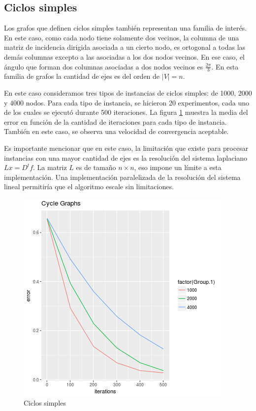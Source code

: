 \documentclass[conference,compsoc,a4paper]{IEEEtran}
\begin{document}
\subsection{Ciclos simples}

Los grafos que definen ciclos simples también representan una familia 
de interés. En este caso, como cada nodo tiene solamente dos vecinos, 
la columna de una matriz de incidencia dirigida asociada a un cierto 
nodo, es ortogonal a todas las demás columnas excepto a las asociadas a 
los dos nodos vecinos. En ese caso, el ángulo que forman dos columnas
asociadas a dos nodos vecinos es $\frac{2\pi}{3}$. En esta familia de 
grafos la cantidad de ejes es del orden de $|V| = n$.

\smallskip

En este caso consideramos tres tipos de instancias de ciclos simples: 
de 1000, 2000 y 4000 nodos. Para cada tipo de instancia, se hicieron 
20 experimentos, cada uno de los cuales se ejecutó durante 500 
iteraciones. La figura \ref{fig:cycle} muestra la media del error en 
función de la cantidad de iteraciones para cada tipo de instancia. 
También en este caso, se observa una velocidad de convergencia 
aceptable.

\smallskip

Es importante mencionar que en este caso, la limitación que existe para 
procesar instancias con una mayor cantidad de ejes es la resolución del 
sistema laplaciano $Lx = D^t f$. La matriz $L$ es de tamaño $n \times 
n$, eso impone un límite a esta implementación. Una implementación 
paralelizada de la resolución del sistema lineal permitiría que el 
algoritmo escale sin limitaciones.

\begin{figure}
	\includegraphics[width=\linewidth]{cycle_graphs.png} %
	\caption{Ciclos simples} %
	\label{fig:cycle} %
\end{figure}
\end{document}
